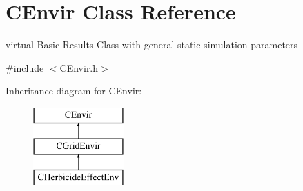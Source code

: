 \hypertarget{class_c_envir}{}\section{C\+Envir Class Reference}
\label{class_c_envir}


virtual Basic Results Class with general static simulation parameters  




{\ttfamily \#include $<$C\+Envir.\+h$>$}

Inheritance diagram for C\+Envir\+:\begin{figure}[H]
\begin{center}
\leavevmode
\includegraphics[height=3.000000cm]{class_c_envir}
\end{center}
\end{figure}
